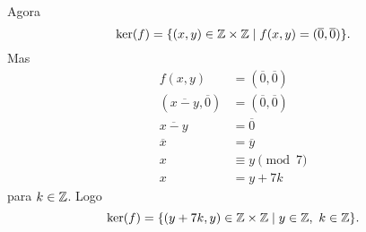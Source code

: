 \documentclass[12pt]{article}
\begin{document}
Agora
\[
	\ker(f) = \{(x,y) \in \mathbb{Z}\times\mathbb{Z} \mid f(x,y) = (\overline{0},\overline{0})\}.
\]
Mas
\begin{align*}
	f(x,y) &= (\overline{0},\overline{0})\\
	(\overline{x-y},\overline{0}) &= (\overline{0},\overline{0})\\
	\overline{x-y} &= \overline{0}\\
	\overline{x} &= \overline{y}\\
	x &\equiv y \pmod 7\\
	x &= y + 7k
\end{align*}
para $k \in \mathbb{Z}$. Logo
\[
	\ker(f) = \{(y+7k,y) \in \mathbb{Z}\times\mathbb{Z} \mid y\in \mathbb{Z},\ k \in \mathbb{Z}\}.
\]
\end{document}
